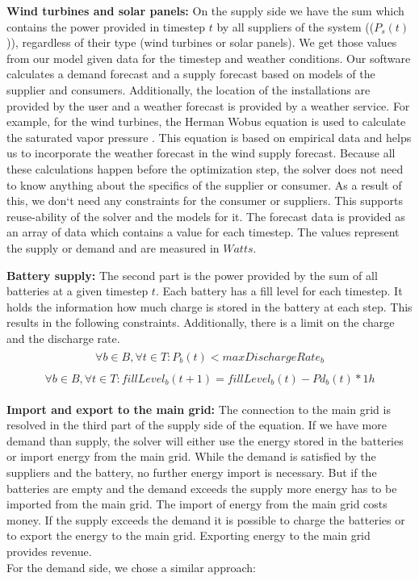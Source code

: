 \textbf{Wind turbines and solar panels:} On the supply side we have the sum which contains the power provided in timestep $t$ by all suppliers of the system (($P_{s}(t)$)), regardless of their type (wind turbines or solar panels).
We get those values from our model given data for the timestep and weather conditions. 
Our software calculates a demand forecast and a supply forecast based on models of the supplier and consumers. 
Additionally, the location of the installations are provided by the user and a weather forecast is provided by a weather service. 
For example, for the wind turbines, the Herman Wobus equation is used to calculate the saturated vapor pressure \cite{NOAA}. 
This equation is based on empirical data and helps us to incorporate the weather forecast in the wind supply forecast. 
Because all these calculations happen before the optimization step, the solver does not need to know anything about the specifics of the supplier or consumer. As a result of this, we don`t need any constraints for the consumer or suppliers. 
This supports reuse-ability of the solver and the models for it. 
The forecast data is provided as an array of data which contains a value for each timestep. 
The values represent the supply or demand and are measured in $Watts$.  %

\textbf{Battery supply:} The second part is the power provided by the sum of all batteries at a given timestep $t$.  Each battery has a fill level for each timestep. It holds the information how much charge is stored in the battery at each step. This results in the following constraints. Additionally, there is a limit on the charge and the discharge rate.
\begin{align} \label{eq:limitDischarge}
\begin{split}
\forall b \in B, \forall t \in T: P_{b}(t) < maxDischargeRate_{b}
\end{split}
\end{align}
\begin{align} \label{eq:discharge100}
\begin{split}
\forall b \in B, \forall t \in T: fillLevel_{b}(t+1) = fillLevel_{b}(t) - Pd_{b}(t) * 1h
\end{split}
\end{align}

\textbf{Import and export to the main grid:} The connection to the main grid is resolved in the third part of the supply side of the equation.
If we have more demand than supply, the solver will either use the energy stored in the batteries or import energy from the main grid. While the demand is satisfied by the suppliers and the battery, no further energy import is necessary. But if the batteries are empty and the demand exceeds the supply more energy has to be imported from the main grid. The import of energy from the main grid costs money. If the supply exceeds the demand it is possible to charge the batteries or to export the energy to the main grid. Exporting energy to the main grid provides revenue.
\\\newline
For the demand side, we chose a similar approach:

